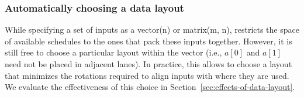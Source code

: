 \subsubsection*{Automatically choosing a data layout}
While specifying a set of inputs as a {\sf vector(n)} or {\sf matrix(m, n)}, \system restricts the space of available schedules to the ones that pack these inputs together.
However, it is still free to choose a particular layout within the vector (i.e., $a[0]$ and $a[1]$ need not be placed in adjacent lanes).
In practice, this allows \system to choose a layout that minimizes the rotations required to align inputs with where they are used.
We evaluate the effectiveness of this choice in Section~\ref{sec:effects-of-data-layout}.



